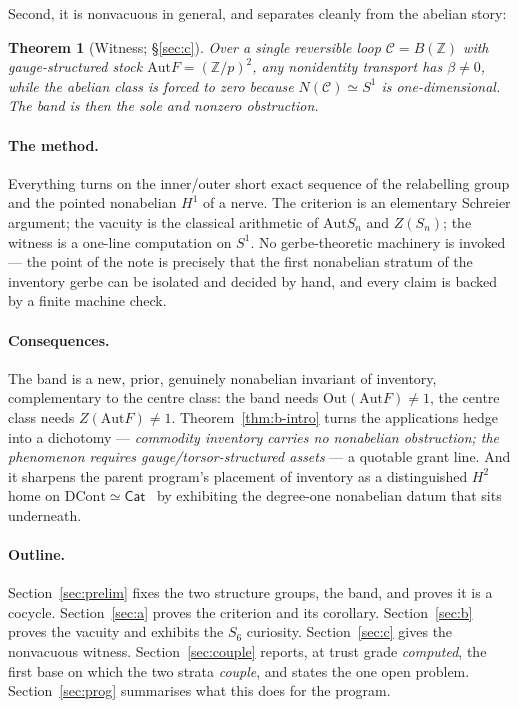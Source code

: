 \documentclass[11pt]{article}
\newtheorem{theorem}{Theorem}
\theoremstyle{definition}
\newcommand{\Cat}{\mathsf{Cat}}
\newcommand{\C}{\mathcal{C}}
\newcommand{\Z}{\mathbb{Z}}
\newcommand{\Aut}{\mathrm{Aut}}
\newcommand{\Out}{\mathrm{Out}}
\newcommand{\DCont}{\mathrm{DCont}}
\begin{document}
Second, it is nonvacuous in general, and separates cleanly from the abelian story:

\begin{theorem}[Witness; \S\ref{sec:c}]\label{thm:c-intro}
Over a single reversible loop $\C=B(\Z)$ with gauge-structured stock $\Aut F=(\Z/p)^2$, any
nonidentity transport has $\beta\neq0$, while the abelian class is forced to zero because
$N(\C)\simeq S^1$ is one-dimensional. The band is then the sole and nonzero obstruction.
\end{theorem}

\paragraph{The method.} Everything turns on the inner/outer short exact sequence of the relabelling
group and the pointed nonabelian $H^1$ of a nerve. The criterion is an elementary Schreier argument;
the vacuity is the classical arithmetic of $\Aut S_n$ and $Z(S_n)$; the witness is a one-line
computation on $S^1$. No gerbe-theoretic machinery is invoked --- the point of the note is precisely
that the first nonabelian stratum of the inventory gerbe can be isolated and decided by hand, and
every claim is backed by a finite machine check.

\paragraph{Consequences.} The band is a new, prior, genuinely nonabelian invariant of inventory,
complementary to the centre class: the band needs $\Out(\Aut F)\neq1$, the centre class needs
$Z(\Aut F)\neq1$. Theorem~\ref{thm:b-intro} turns the applications hedge into a dichotomy ---
\emph{commodity inventory carries no nonabelian obstruction; the phenomenon requires
gauge/torsor-structured assets} --- a quotable grant line. And it sharpens the parent program's
placement of inventory as a distinguished $H^2$ home on $\DCont\simeq\Cat$~\cite{au-dccat} by
exhibiting the degree-one nonabelian datum that sits underneath.

\paragraph{Outline.} Section~\ref{sec:prelim} fixes the two structure groups, the band, and proves it
is a cocycle. Section~\ref{sec:a} proves the criterion and its corollary. Section~\ref{sec:b} proves
the vacuity and exhibits the $S_6$ curiosity. Section~\ref{sec:c} gives the nonvacuous witness.
Section~\ref{sec:couple} reports, at trust grade \emph{computed}, the first base on which the two
strata \emph{couple}, and states the one open problem. Section~\ref{sec:prog} summarises what this
does for the program.
\end{document}
